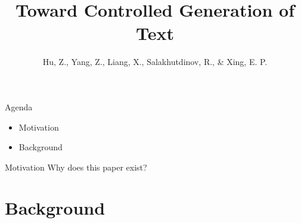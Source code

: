 \documentclass{beamer}
\title{Toward Controlled Generation of Text}
\date{}
\author{Hu, Z., Yang, Z., Liang, X., Salakhutdinov, R., \& Xing, E. P.}
\institute{International Conference on Machine Learning. 2017}
\begin{document}
  \maketitle
  \begin{frame}{Agenda}
    \begin{itemize}
    	\item Motivation
    	\item Background
    \end{itemize}
  \end{frame}
  \begin{frame}{Motivation}
    Why does this paper exist?
  \end{frame}
  \section{Background}
\end{document}
